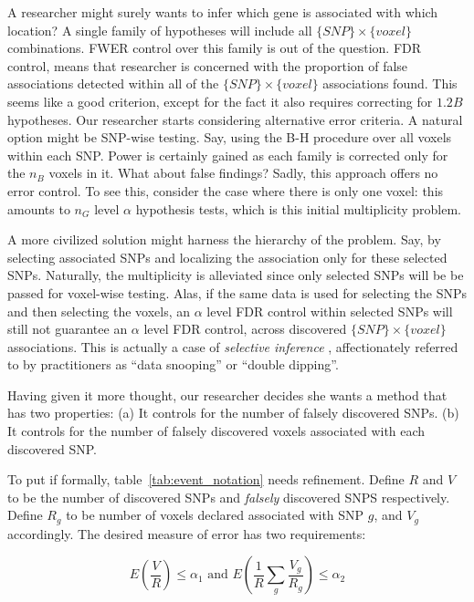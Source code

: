 \documentclass[review,12pt]{article}
\begin{document}
A researcher might surely wants to infer which gene is associated with which location? 
A single family of hypotheses will include all $\{SNP\} \times \{voxel\}$ combinations. 
FWER control over this family is out of the question. 
FDR control, means that researcher is concerned with the proportion of false associations detected within all of the $\{SNP\} \times \{voxel\}$ associations found. This seems like a good criterion, except for the fact it also requires correcting for $1.2B$ hypotheses. 
Our researcher starts considering alternative error criteria. 
A natural option might be SNP-wise testing. Say, using the B-H procedure over all voxels within each SNP. Power is certainly gained as each family is corrected only for the $n_B$ voxels in it. 
What about false findings? Sadly, this approach offers no error control. To see this, consider the case where there is only one voxel: this amounts to $n_G$ level $\alpha$ hypothesis tests, which is this initial multiplicity problem. 

A more civilized solution might harness the hierarchy of the problem. Say, by selecting associated SNPs and localizing the association only for these selected SNPs. 
Naturally, the multiplicity is alleviated since only selected SNPs will be be passed for voxel-wise testing. Alas, if the same data is used for selecting the SNPs and then selecting the voxels, an $\alpha$ level FDR control within selected SNPs will still not guarantee an $\alpha$ level FDR control, across discovered $\{SNP\} \times \{voxel\}$ associations. This is actually a case of \emph{selective inference} \citep{benjamini_simultaneous_2010}, affectionately referred to by practitioners as ``data snooping'' or ``double dipping''. 

Having given it more thought, our researcher decides she wants a method that has two properties: 
(a) It controls for the number of falsely discovered SNPs. 
(b) It controls for the number of falsely discovered voxels associated with each discovered SNP. 

To put if formally, table~\ref{tab:event_notation} needs refinement. 
Define $R$ and $V$ to be the number of discovered SNPs and \emph{falsely} discovered SNPS respectively. 
Define $R_g$ to be number of voxels declared associated with SNP $g$, and $V_g$ accordingly. The desired measure of error has two requirements: 

\begin{equation} \label{eq:hirarchial_error}
 E \left(\frac{V}{R} \right)\leq \alpha_1 
\text{ and } 
E \left( \frac{1}{R}\sum_{g} \frac{V_{g}}{R_{g}} \right)\leq \alpha_2
\end{equation}
\end{document}
